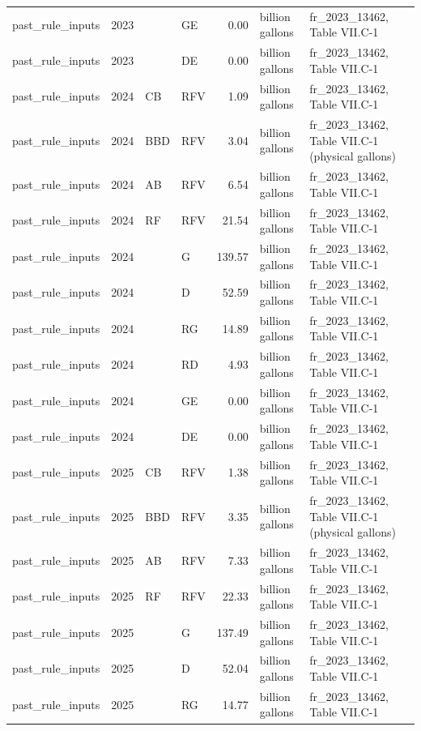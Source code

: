 \begin{longtable}{p{2.3cm}p{0.7cm}p{1.0cm}p{2.6cm}rp{1.7cm}p{4.6cm}}
past\_rule\_inputs & 2023 &  & GE & 0.00 & billion gallons & fr\_2023\_13462, Table VII.C-1 \\
past\_rule\_inputs & 2023 &  & DE & 0.00 & billion gallons & fr\_2023\_13462, Table VII.C-1 \\
past\_rule\_inputs & 2024 & CB & RFV & 1.09 & billion gallons & fr\_2023\_13462, Table VII.C-1 \\
past\_rule\_inputs & 2024 & BBD & RFV & 3.04 & billion gallons & fr\_2023\_13462, Table VII.C-1 (physical gallons) \\
past\_rule\_inputs & 2024 & AB & RFV & 6.54 & billion gallons & fr\_2023\_13462, Table VII.C-1 \\
past\_rule\_inputs & 2024 & RF & RFV & 21.54 & billion gallons & fr\_2023\_13462, Table VII.C-1 \\
past\_rule\_inputs & 2024 &  & G & 139.57 & billion gallons & fr\_2023\_13462, Table VII.C-1 \\
past\_rule\_inputs & 2024 &  & D & 52.59 & billion gallons & fr\_2023\_13462, Table VII.C-1 \\
past\_rule\_inputs & 2024 &  & RG & 14.89 & billion gallons & fr\_2023\_13462, Table VII.C-1 \\
past\_rule\_inputs & 2024 &  & RD & 4.93 & billion gallons & fr\_2023\_13462, Table VII.C-1 \\
past\_rule\_inputs & 2024 &  & GE & 0.00 & billion gallons & fr\_2023\_13462, Table VII.C-1 \\
past\_rule\_inputs & 2024 &  & DE & 0.00 & billion gallons & fr\_2023\_13462, Table VII.C-1 \\
past\_rule\_inputs & 2025 & CB & RFV & 1.38 & billion gallons & fr\_2023\_13462, Table VII.C-1 \\
past\_rule\_inputs & 2025 & BBD & RFV & 3.35 & billion gallons & fr\_2023\_13462, Table VII.C-1 (physical gallons) \\
past\_rule\_inputs & 2025 & AB & RFV & 7.33 & billion gallons & fr\_2023\_13462, Table VII.C-1 \\
past\_rule\_inputs & 2025 & RF & RFV & 22.33 & billion gallons & fr\_2023\_13462, Table VII.C-1 \\
past\_rule\_inputs & 2025 &  & G & 137.49 & billion gallons & fr\_2023\_13462, Table VII.C-1 \\
past\_rule\_inputs & 2025 &  & D & 52.04 & billion gallons & fr\_2023\_13462, Table VII.C-1 \\
past\_rule\_inputs & 2025 &  & RG & 14.77 & billion gallons & fr\_2023\_13462, Table VII.C-1 \\

\end{longtable}
